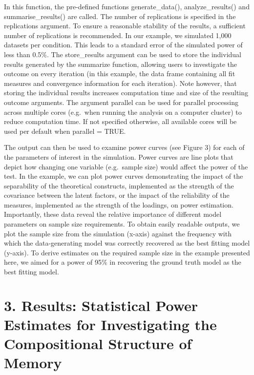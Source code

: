 \documentclass[
  man,floatsintext]{apa6}
\begin{document}
In this function, the pre-defined functions generate\_data(), analyze\_results() and summarise\_results() are called. The number of replications is specified in the replications argument. To ensure a reasonable stability of the results, a sufficient number of replications is recommended. In our example, we simulated 1,000 datasets per condition. This leads to a standard error of the simulated power of less than 0.5\%. The store\_results argument can be used to store the individual results generated by the summarize function, allowing users to investigate the outcome on every iteration (in this example, the data frame containing all fit measures and convergence information for each iteration). Note however, that storing the individual results increases computation time and size of the resulting outcome arguments. The argument parallel can be used for parallel processing across multiple cores (e.g.~when running the analysis on a computer cluster) to reduce computation time. If not specified otherwise, all available cores will be used per default when parallel = TRUE.

The output can then be used to examine power curves (see Figure 3) for each of the parameters of interest in the simulation. Power curves are line plots that depict how changing one variable (e.g.~sample size) would affect the power of the test. In the example, we can plot power curves demonstrating the impact of the separability of the theoretical constructs, implemented as the strength of the covariance between the latent factors, or the impact of the reliability of the measures, implemented as the strength of the loadings, on power estimation. Importantly, these data reveal the relative importance of different model parameters on sample size requirements. To obtain easily readable outputs, we plot the sample size from the simulation (x-axis) against the frequency with which the data-generating model was correctly recovered as the best fitting model (y-axis). To derive estimates on the required sample size in the example presented here, we aimed for a power of 95\% in recovering the ground truth model as the best fitting model.

\hypertarget{results-statistical-power-estimates-for-investigating-the-compositional-structure-of-memory}{%
\section{3. Results: Statistical Power Estimates for Investigating the Compositional Structure of Memory}\label{results-statistical-power-estimates-for-investigating-the-compositional-structure-of-memory}}
\end{document}
